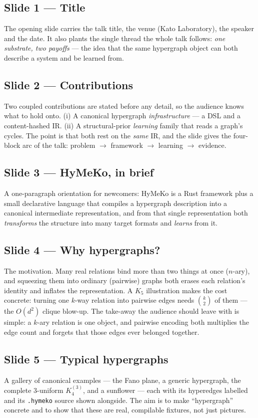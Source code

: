 \documentclass[10pt]{article}
\begin{document}
\subsection*{Slide 1 --- Title}
The opening slide carries the talk title, the venue (Kato Laboratory), the speaker and the date. It also plants the single thread the whole talk follows: \emph{one substrate, two payoffs} --- the idea that the same hypergraph object can both describe a system and be learned from.

\subsection*{Slide 2 --- Contributions}
Two coupled contributions are stated before any detail, so the audience knows what to hold onto. (i) A canonical hypergraph \emph{infrastructure} --- a DSL and a content-hashed IR. (ii) A structural-prior \emph{learning} family that reads a graph's cycles. The point is that both rest on the \emph{same} IR, and the slide gives the four-block arc of the talk: problem $\to$ framework $\to$ learning $\to$ evidence.

\subsection*{Slide 3 --- HyMeKo, in brief}
A one-paragraph orientation for newcomers: HyMeKo is a Rust framework plus a small declarative language that compiles a hypergraph description into a canonical intermediate representation, and from that single representation both \emph{transforms} the structure into many target formats and \emph{learns} from it.

\subsection*{Slide 4 --- Why hypergraphs?}
The motivation. Many real relations bind more than two things at once ($n$-ary), and squeezing them into ordinary (pairwise) graphs both erases each relation's identity and inflates the representation. A $K_5$ illustration makes the cost concrete: turning one $k$-way relation into pairwise edges needs $\binom{k}{2}$ of them --- the $O(d^2)$ clique blow-up. The take-away the audience should leave with is simple: a $k$-ary relation is one object, and pairwise encoding both multiplies the edge count and forgets that those edges ever belonged together.

\subsection*{Slide 5 --- Typical hypergraphs}
A gallery of canonical examples --- the Fano plane, a generic hypergraph, the complete 3-uniform $K_4^{(3)}$, and a sunflower --- each with its hyperedges labelled and its \texttt{.hymeko} source shown alongside. The aim is to make ``hypergraph'' concrete and to show that these are real, compilable fixtures, not just pictures.
\end{document}
